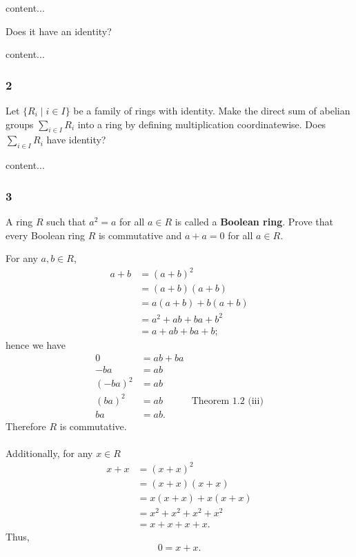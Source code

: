 \begin{enumerate}[(a)]
	\begin{solution}
		content...
	\end{solution}
	\begin{lightgraybox}
		Does it have an identity?
	\end{lightgraybox}
	\begin{solution}
		content...
	\end{solution}
\end{enumerate}

\subsubsection*{2}
\begin{graybox}
	Let $\{R_i \mid i \in I\}$ be a family of rings with identity. Make the direct sum of abelian groups $\sum_{i \in I} R_i$ into a ring by defining multiplication coordinatewise. Does $\sum_{i \in I}R_i$ have identity?
\end{graybox}
\begin{solution}
	content...
\end{solution}

\subsubsection*{3}
\begin{graybox}
	A ring $R$ such that $a^2 = a$ for all $a \in R$ is called a \textbf{Boolean ring}. Prove that every Boolean ring $R$ is commutative and $a + a = 0$ for all $a \in R$.
\end{graybox}
\begin{solution}
	For any $a, b \in R$,
	\begin{align*}
		a + b &= (a + b)^2\\
		&= (a + b)(a + b)\\
		&= a(a + b) + b(a + b)\\
		&= a^2 + ab + ba + b^2\\
		&= a + ab + ba + b;
	\end{align*}
	hence we have
	\begin{align*}
		0 &= ab + ba\\
		-ba &= ab\\
		(-ba)^2 &= ab\\
		(ba)^2 &= ab & \text{Theorem 1.2 (iii)}\\
		ba &= ab.
	\end{align*}
	Therefore $R$ is commutative.\\
	\\
	Additionally, for any $x \in R$
	\begin{align*}
		x + x &= (x + x)^2\\
		&= (x + x)(x + x)\\
		&= x(x + x) + x(x + x)\\
		&= x^2 + x^2 + x^2 + x^2\\
		&= x + x + x + x.
	\end{align*}
	Thus,
	$$
		0 = x + x.
	$$
\end{solution}

